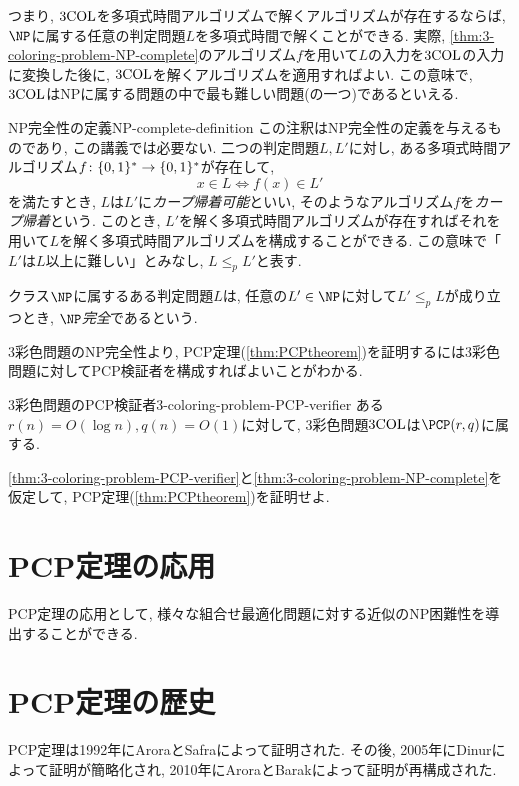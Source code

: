 つまり, $\mathrm{3COL}$を多項式時間アルゴリズムで解くアルゴリズムが存在するならば, $\NP$に属する任意の判定問題$L$を多項式時間で解くことができる. 実際, \cref{thm:3-coloring-problem-NP-complete}のアルゴリズム$f$を用いて$L$の入力を$\mathrm{3COL}$の入力に変換した後に, $\mathrm{3COL}$を解くアルゴリズムを適用すればよい.
この意味で, $\mathrm{3COL}$はNPに属する問題の中で最も難しい問題(の一つ)であるといえる.

\begin{remark}{NP完全性の定義}{NP-complete-definition}
  この注釈はNP完全性の定義を与えるものであり, この講義では必要ない.
  二つの判定問題$L,L'$に対し, ある多項式時間アルゴリズム$f\colon\{0,1\}^*\to\{0,1\}^*$が存在して, \[x\in L \iff f(x)\in L'\]を満たすとき, $L$は$L'$に\emph{カープ帰着可能}といい, そのようなアルゴリズム$f$を\emph{カープ帰着}という. このとき, $L'$を解く多項式時間アルゴリズムが存在すればそれを用いて$L$を解く多項式時間アルゴリズムを構成することができる. この意味で「$L'$は$L$以上に難しい」とみなし, $L \le_p L'$と表す.

  クラス$\NP$に属するある判定問題$L$は, 任意の$L'\in\NP$に対して$L'\le_p L$が成り立つとき, \emph{$\NP$完全}であるという.
\end{remark}

3彩色問題のNP完全性より, PCP定理(\cref{thm:PCPtheorem})を証明するには3彩色問題に対してPCP検証者を構成すればよいことがわかる.

\begin{theorem}{3彩色問題のPCP検証者}{3-coloring-problem-PCP-verifier}
  ある$r(n)=O(\log n),q(n)=O(1)$に対して, 3彩色問題$\mathrm{3COL}$は$\PCP(r,q)$に属する.
\end{theorem}

\begin{exercise}{}{}
  \cref{thm:3-coloring-problem-PCP-verifier}と\cref{thm:3-coloring-problem-NP-complete}を仮定して, PCP定理(\cref{thm:PCPtheorem})を証明せよ.
\end{exercise}

\section{PCP定理の応用}
PCP定理の応用として, 様々な組合せ最適化問題に対する近似のNP困難性を導出することができる.

\section{PCP定理の歴史}
PCP定理は1992年にAroraとSafraによって証明された.
その後, 2005年にDinurによって証明が簡略化され, 2010年にAroraとBarakによって証明が再構成された.


